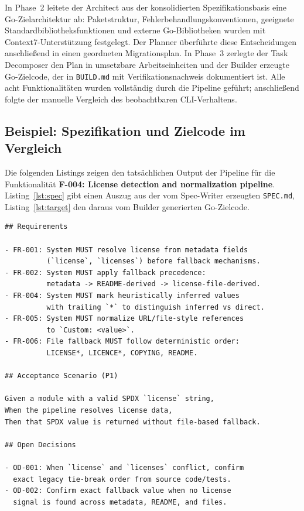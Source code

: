 In Phase~2 leitete der Architect aus der konsolidierten Spezifikationsbasis eine Go-Zielarchitektur ab: Paketstruktur, Fehlerbehandlungskonventionen, geeignete Standardbibliotheksfunktionen und externe Go-Bibliotheken wurden mit Context7-Unterstützung festgelegt. Der Planner überführte diese Entscheidungen anschließend in einen geordneten Migrationsplan. In Phase~3 zerlegte der Task Decomposer den Plan in umsetzbare Arbeitseinheiten und der Builder erzeugte Go-Zielcode, der in \texttt{BUILD.md} mit Verifikationsnachweis dokumentiert ist. Alle acht Funktionalitäten wurden vollständig durch die Pipeline geführt; anschließend folgte der manuelle Vergleich des beobachtbaren CLI-Verhaltens.

\subsection{Beispiel: Spezifikation und Zielcode im Vergleich}

Die folgenden Listings zeigen den tatsächlichen Output der Pipeline für die Funktionalität \textbf{F-004: License detection and normalization pipeline}. Listing~\ref{lst:spec} gibt einen Auszug aus der vom Spec-Writer erzeugten \texttt{SPEC.md}, Listing~\ref{lst:target} den daraus vom Builder generierten Go-Zielcode.

\begin{lstlisting}[style=codestyle, caption={Auszug aus der erzeugten SPEC.md für F-004 (License detection and normalization pipeline)}, label=lst:spec]
## Requirements

- FR-001: System MUST resolve license from metadata fields
          (`license`, `licenses`) before fallback mechanisms.
- FR-002: System MUST apply fallback precedence:
          metadata -> README-derived -> license-file-derived.
- FR-004: System MUST mark heuristically inferred values
          with trailing `*` to distinguish inferred vs direct.
- FR-005: System MUST normalize URL/file-style references
          to `Custom: <value>`.
- FR-006: File fallback MUST follow deterministic order:
          LICENSE*, LICENCE*, COPYING, README.

## Acceptance Scenario (P1)

Given a module with a valid SPDX `license` string,
When the pipeline resolves license data,
Then that SPDX value is returned without file-based fallback.

## Open Decisions

- OD-001: When `license` and `licenses` conflict, confirm
  exact legacy tie-break order from source code/tests.
- OD-002: Confirm exact fallback value when no license
  signal is found across metadata, README, and files.
\end{lstlisting}

